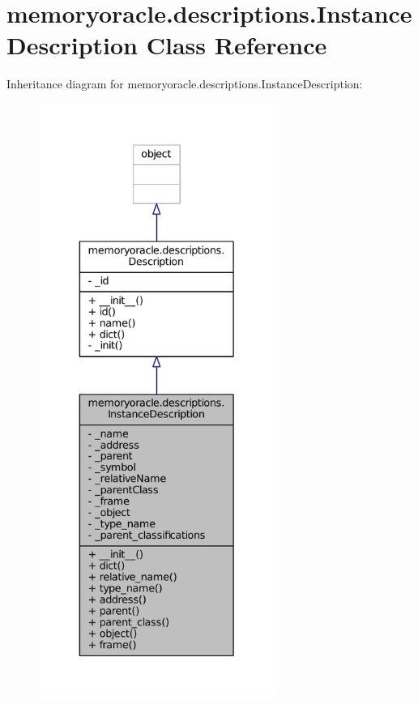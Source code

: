 \hypertarget{classmemoryoracle_1_1descriptions_1_1InstanceDescription}{}\section{memoryoracle.\+descriptions.\+Instance\+Description Class Reference}
\label{classmemoryoracle_1_1descriptions_1_1InstanceDescription}


Inheritance diagram for memoryoracle.\+descriptions.\+Instance\+Description\+:\nopagebreak
\begin{figure}[H]
\begin{center}
\leavevmode
\includegraphics[height=550pt]{classmemoryoracle_1_1descriptions_1_1InstanceDescription__inherit__graph}
\end{center}
\end{figure}


